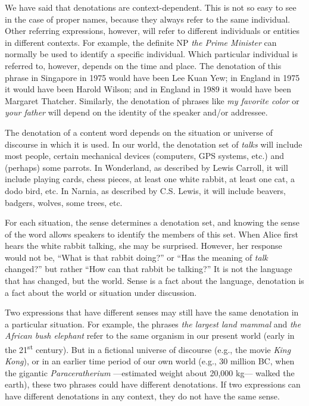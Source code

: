 We have said that denotations are context-dependent. This is not so easy to see in the case of proper names, because they always refer to the same individual. Other referring expressions, however, will refer to different individuals or entities in different contexts. For example, the definite NP \textit{the Prime Minister} can normally be used to identify a specific individual. Which particular individual is referred to, however, depends on the time and place. The denotation of this phrase in Singapore in 1975 would have been Lee Kuan Yew; in England in 1975 it would have been Harold Wilson; and in England in 1989 it would have been Margaret Thatcher. Similarly, the denotation of phrases like \textit{my favorite color} or \textit{your father} will depend on the identity of the speaker and/or addressee.



The denotation of a content word depends on the situation or universe of discourse in which it is used. In our world, the denotation set of \textit{talks} will include most people, certain mechanical devices (computers, GPS systems, etc.) and (perhaps) some parrots. In Wonderland, as described by Lewis Carroll, it will include playing cards, chess pieces, at least one white rabbit, at least one cat, a dodo bird, etc. In Narnia, as described by C.S. Lewis, it will include beavers, badgers, wolves, some trees, etc.



For each situation, the sense determines a denotation set, and knowing the sense of the word allows speakers to identify the members of this set. When Alice first hears the white rabbit talking, she may be surprised. However, her response would not be, “What is that rabbit doing?” or “Has the meaning of \textit{talk} changed?” but rather “How can that rabbit be talking?” It is not the language that has changed, but the world. Sense is a fact about the language, denotation is a fact about the world or situation under discussion.



Two expressions that have different senses may still have the same denotation in a particular situation. For example, the phrases \textit{the largest land mammal} and \textit{the African bush elephant} refer to the same organism in our present world (early in the 21\textsuperscript{st} century). But in a fictional universe of discourse (e.g., the movie \textit{King Kong}), or in an earlier time period of our own world (e.g., 30 million BC, when the gigantic \textit{Paraceratherium} —estimated weight about 20,000 kg— walked the earth), these two phrases could have different denotations. If two expressions can have different denotations in any context, they do not have the same sense.



